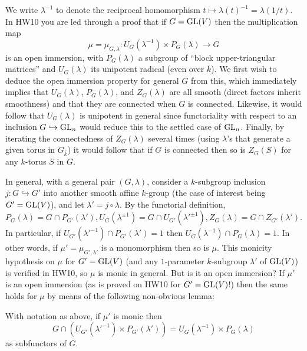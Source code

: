 \documentclass[10pt]{article}
\renewcommand{\(}{\left(}
\renewcommand{\)}{\right)}
\numberwithin{thm}{subsection}
\begin{document}
We write $\lambda^{-1}$ to denote the reciprocal homomorphism $t \mapsto \lambda(t)^{-1} = 
\lambda(1/t)$. 
In HW10 you are led through a proof that if $G = {\rm{GL}}(V)$ then the multiplication map
$$\mu = \mu_{G,\lambda}:U_G(\lambda^{-1}) \times P_G(\lambda) \rightarrow G$$
is an open immersion, with $P_G(\lambda)$ a subgroup of ``block upper-triangular matrices''
and $U_G(\lambda)$ its unipotent radical (even over $\overline{k}$).  We first wish to 
deduce the open immersion property for general $G$ from this, which immediately implies
that $U_G(\lambda)$,
$P_G(\lambda)$, and $Z_G(\lambda)$ are all smooth (direct factors inherit smoothness) and that they 
 are connected when $G$ is connected.  Likewise, it would follow that $U_G(\lambda)$
 is unipotent in general since functoriality with respect to an inclusion
 $G \hookrightarrow {\rm{GL}}_n$ would reduce this to the settled case
 of ${\rm{GL}}_n$.  Finally, by iterating the connectedness of $Z_G(\lambda)$ several times (using
$\lambda$'s that generate a given torus in $G_{\overline{k}}$) it would follow that if $G$ is connected then so is 
$Z_G(S)$ for any $k$-torus $S$ in $G$. 

In general, with a general pair $(G,\lambda)$, consider a $k$-subgroup inclusion $j:G \hookrightarrow G'$ into
another smooth affine $k$-group (the case of interest being $G' = {\rm{GL}}(V)$), 
and let $\lambda' = j \circ \lambda$.
By the functorial definition, 
$$P_G(\lambda) = G \cap P_{G'}(\lambda'), U_G(\lambda^{\pm 1}) = G \cap
U_{G'}({\lambda'}^{\pm 1}), Z_G(\lambda) = G \cap Z_{G'}(\lambda').$$
In particular, if $U_{G'}({\lambda'}^{-1}) \cap P_{G'}(\lambda') = 1$
then $U_G(\lambda^{-1}) \cap P_G(\lambda) = 1$.  In other words,
if $\mu' = \mu_{G',\lambda'}$ is a monomorphism then so is $\mu$.
This monicity hypothesis on $\mu$ for $G' = {\rm{GL}}(V)$ (and any $1$-parameter
$k$-subgroup $\lambda'$ of ${\rm{GL}}(V)$) is verified in HW10, so 
$\mu$ is monic in general.  But is it an open immersion?
If $\mu'$ is an open immersion (as is proved on HW10 for $G' = {\rm{GL}}(V)$!)
then the same holds for $\mu$ by means of the following non-obvious lemma:

\begin{lemma}\label{subeq} With notation as above, if $\mu'$ is monic then
$$G \cap (U_{G'}({\lambda'}^{-1}) \times P_{G'}(\lambda')) = U_G(\lambda^{-1}) \times
P_G(\lambda)$$
as subfunctors of $G$.
\end{lemma}
\end{document}
